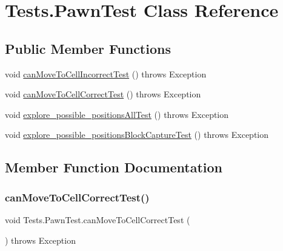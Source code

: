 \hypertarget{class_tests_1_1_pawn_test}{}\section{Tests.\+Pawn\+Test Class Reference}
\label{class_tests_1_1_pawn_test}
\subsection*{Public Member Functions}
\begin{DoxyCompactItemize}
\item 
void \hyperlink{class_tests_1_1_pawn_test_aec96d9b7e52313d9da19774d4f5eb930}{can\+Move\+To\+Cell\+Incorrect\+Test} ()  throws Exception 
\item 
void \hyperlink{class_tests_1_1_pawn_test_a0c6b158dbc92e9ec87469953766229bd}{can\+Move\+To\+Cell\+Correct\+Test} ()  throws Exception 
\item 
void \hyperlink{class_tests_1_1_pawn_test_a668f1c8e1e03f1d7f3c57c52881e1246}{explore\+\_\+possible\+\_\+positions\+All\+Test} ()  throws Exception 
\item 
void \hyperlink{class_tests_1_1_pawn_test_acc141a39019b36025a8a3aad46c00968}{explore\+\_\+possible\+\_\+positions\+Block\+Capture\+Test} ()  throws Exception 
\end{DoxyCompactItemize}


\subsection{Member Function Documentation}
\mbox{\label{class_tests_1_1_pawn_test_a0c6b158dbc92e9ec87469953766229bd}} 
\subsubsection{\texorpdfstring{can\+Move\+To\+Cell\+Correct\+Test()}{canMoveToCellCorrectTest()}}
{\footnotesize\ttfamily void Tests.\+Pawn\+Test.\+can\+Move\+To\+Cell\+Correct\+Test (\begin{DoxyParamCaption}{ }\end{DoxyParamCaption}) throws Exception\hspace{0.3cm}{\ttfamily [inline]}}

